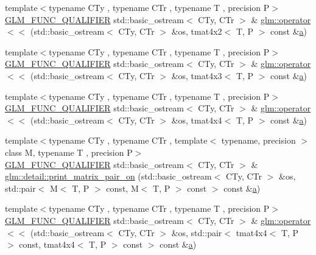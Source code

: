 \begin{DoxyCompactItemize}
\item 
{\footnotesize template$<$typename C\+Ty , typename C\+Tr , typename T , precision P$>$ }\\\mbox{\hyperlink{setup_8hpp_a33fdea6f91c5f834105f7415e2a64407}{G\+L\+M\+\_\+\+F\+U\+N\+C\+\_\+\+Q\+U\+A\+L\+I\+F\+I\+ER}} std\+::basic\+\_\+ostream$<$ C\+Ty, C\+Tr $>$ \& \mbox{\hyperlink{group__gtx__io_ga8ce3cf61260e62080a9596c2f10ab4a0}{glm\+::operator$<$$<$}} (std\+::basic\+\_\+ostream$<$ C\+Ty, C\+Tr $>$ \&os, tmat4x2$<$ T, P $>$ const \&\mbox{\hyperlink{glad_8h_ac8729153468b5dcf13f971b21d84d4e5}{a}})
\item 
{\footnotesize template$<$typename C\+Ty , typename C\+Tr , typename T , precision P$>$ }\\\mbox{\hyperlink{setup_8hpp_a33fdea6f91c5f834105f7415e2a64407}{G\+L\+M\+\_\+\+F\+U\+N\+C\+\_\+\+Q\+U\+A\+L\+I\+F\+I\+ER}} std\+::basic\+\_\+ostream$<$ C\+Ty, C\+Tr $>$ \& \mbox{\hyperlink{group__gtx__io_gaca75b14a0534a02860349a114a10aa44}{glm\+::operator$<$$<$}} (std\+::basic\+\_\+ostream$<$ C\+Ty, C\+Tr $>$ \&os, tmat4x3$<$ T, P $>$ const \&\mbox{\hyperlink{glad_8h_ac8729153468b5dcf13f971b21d84d4e5}{a}})
\item 
{\footnotesize template$<$typename C\+Ty , typename C\+Tr , typename T , precision P$>$ }\\\mbox{\hyperlink{setup_8hpp_a33fdea6f91c5f834105f7415e2a64407}{G\+L\+M\+\_\+\+F\+U\+N\+C\+\_\+\+Q\+U\+A\+L\+I\+F\+I\+ER}} std\+::basic\+\_\+ostream$<$ C\+Ty, C\+Tr $>$ \& \mbox{\hyperlink{group__gtx__io_ga6683acc91ba7ce5822e25a2517550bff}{glm\+::operator$<$$<$}} (std\+::basic\+\_\+ostream$<$ C\+Ty, C\+Tr $>$ \&os, tmat4x4$<$ T, P $>$ const \&\mbox{\hyperlink{glad_8h_ac8729153468b5dcf13f971b21d84d4e5}{a}})
\item 
{\footnotesize template$<$typename C\+Ty , typename C\+Tr , template$<$ typename, precision $>$ class M, typename T , precision P$>$ }\\\mbox{\hyperlink{setup_8hpp_a33fdea6f91c5f834105f7415e2a64407}{G\+L\+M\+\_\+\+F\+U\+N\+C\+\_\+\+Q\+U\+A\+L\+I\+F\+I\+ER}} std\+::basic\+\_\+ostream$<$ C\+Ty, C\+Tr $>$ \& \mbox{\hyperlink{namespaceglm_1_1detail_aff6c8f1c43115431bf40167f6638b78f}{glm\+::detail\+::print\+\_\+matrix\+\_\+pair\+\_\+on}} (std\+::basic\+\_\+ostream$<$ C\+Ty, C\+Tr $>$ \&os, std\+::pair$<$ M$<$ T, P $>$ const, M$<$ T, P $>$ const $>$ const \&\mbox{\hyperlink{glad_8h_ac8729153468b5dcf13f971b21d84d4e5}{a}})
\item 
{\footnotesize template$<$typename C\+Ty , typename C\+Tr , typename T , precision P$>$ }\\\mbox{\hyperlink{setup_8hpp_a33fdea6f91c5f834105f7415e2a64407}{G\+L\+M\+\_\+\+F\+U\+N\+C\+\_\+\+Q\+U\+A\+L\+I\+F\+I\+ER}} std\+::basic\+\_\+ostream$<$ C\+Ty, C\+Tr $>$ \& \mbox{\hyperlink{group__gtx__io_ga67ab2a9a13c872bd33e6a0455c97ce9c}{glm\+::operator$<$$<$}} (std\+::basic\+\_\+ostream$<$ C\+Ty, C\+Tr $>$ \&os, std\+::pair$<$ tmat4x4$<$ T, P $>$ const, tmat4x4$<$ T, P $>$ const $>$ const \&\mbox{\hyperlink{glad_8h_ac8729153468b5dcf13f971b21d84d4e5}{a}})
\end{DoxyCompactItemize}


